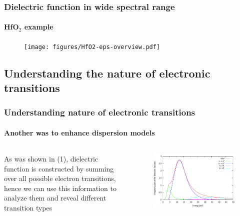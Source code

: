 \documentclass{beamer}
\begin{document}
\begin{frame}
    \frametitle{Dielectric function in wide spectral range}
    \framesubtitle{HfO$_2$ example}

    \begin{figure}
	\texttt{[image: figures/HfO2-eps-overview.pdf]}
	\end{figure}

\end{frame}

\subsection{Understanding the nature of electronic transitions}
\begin{frame}
    \frametitle{Understanding nature of electronic transitions}
    \framesubtitle{Another was to enhance dispersion models}

	\begin{columns}[c]
	As was shown in (1), dielectric function is constructed by summing over all possible electron transitions, hence we can use this information to analyze them and reveal different transition types

    \begin{figure}
	\includegraphics[width=\linewidth]{figures/CH30deconv.pdf}
	\end{figure}
	\end{columns}

\end{frame}
\end{document}
